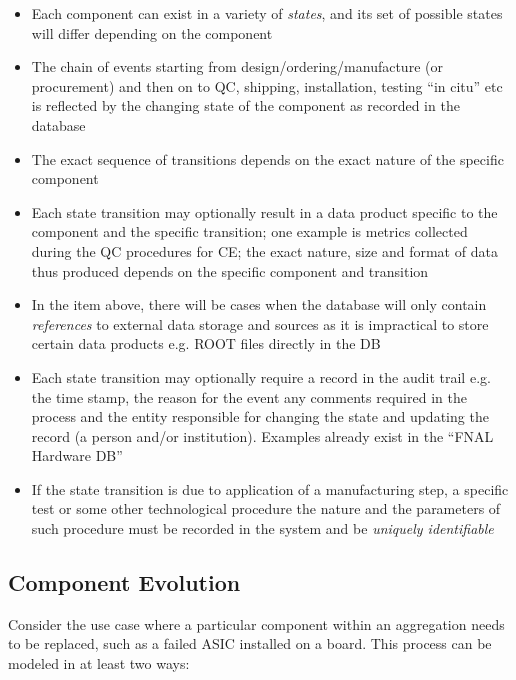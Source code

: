 \documentclass[pdftex,12pt,letter]{article}
\begin{document}
\begin{itemize}

\item Each component can exist in a variety of \textit{states}, and its set of possible states will differ depending on the component

\item The chain of events starting from design/ordering/manufacture (or procurement) and then on to QC,
shipping, installation, testing ``in citu'' etc is reflected by the changing state of the component as recorded
in the database

\item The exact sequence of transitions depends on the exact nature of the specific  component

\item Each state transition may optionally result in a data product specific to the component and the specific transition;
one example is metrics collected during the QC procedures for CE; the exact nature, size and format of data thus produced
depends on the specific component and transition

\item In the item above, there will be cases when the database will only contain \textit{references} to external data storage
and sources as it is impractical to store certain data products e.g. ROOT files directly in the DB

\item Each state transition may optionally require a record in the audit trail e.g.\,the time stamp, the reason for the event
any comments required in the process and the entity responsible for changing the state and updating the record
(a person and/or institution). Examples already exist in the ``FNAL Hardware DB''

\item If the state transition is due to application of a manufacturing step, a specific test or some other technological procedure
the nature and the parameters of such procedure must be recorded in the system and be \textit{uniquely identifiable} 

\end{itemize}

\subsection{Component Evolution}

Consider the use case where a particular component within an aggregation needs to be replaced,
such as a failed ASIC installed on a board. This process can be modeled in at least two ways:
\end{document}
